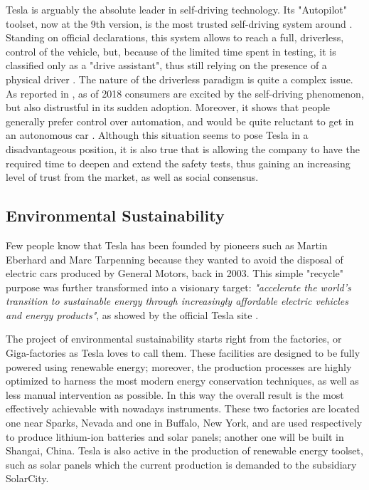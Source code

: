 Tesla is arguably the absolute leader in self-driving technology. Its "Autopilot" toolset, now at the 9th version, is the most trusted self-driving system around \cite{tesla_trust}. Standing on official declarations, this system allows to reach a full, driverless, control of the vehicle, but, because of the limited time spent in testing, it is classified only as a "drive assistant", thus still relying on the presence of a physical driver \cite{tesla_full_self-driving}.
The nature of the driverless paradigm is quite a complex issue. As reported in \cite{tesla_awareness}, as of 2018 consumers are excited by the self-driving phenomenon, but also distrustful in its sudden adoption. Moreover, it shows that people generally prefer control over automation, and would be quite reluctant to get in an autonomous car \cite{tesla_awareness}. Although this situation seems to pose Tesla in a disadvantageous position, it is also true that is allowing the company to have the required time to deepen and extend the safety tests, thus gaining an increasing level of trust from the market, as well as social consensus.

\subsection{Environmental Sustainability}

Few people know that Tesla has been founded by pioneers such as Martin Eberhard and Marc Tarpenning because they wanted to avoid the disposal of electric cars produced by General Motors, back in 2003. \cite{muskGM} This simple "recycle" purpose was further transformed into a visionary target: \emph{"accelerate the world’s transition to sustainable energy through increasingly affordable electric vehicles and energy products"}, as showed by the official Tesla site \cite{aboutTesla}.

The project of environmental sustainability starts right from the factories, or Giga-factories as Tesla loves to call them. These facilities are designed to be fully powered using renewable energy; moreover, the production processes are highly optimized to harness the most modern energy conservation techniques, as well as less manual intervention as possible. In this way the overall result is the most effectively achievable with nowadays instruments. These two factories are located one near Sparks, Nevada and one in Buffalo, New York, and are used respectively to produce lithium-ion batteries and solar panels; another one will be built in Shangai, China. Tesla is also active in the production of renewable energy toolset, such as solar panels which the current production is demanded to the subsidiary SolarCity.

